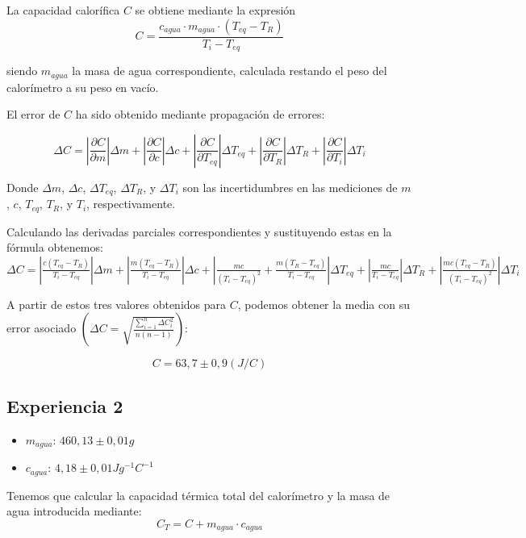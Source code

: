 \documentclass[a4paper,12pt,spanish]{article}
\begin{document}
	La capacidad calorífica $C$ se obtiene mediante la expresión
	\[ C= \frac{c_{agua}\cdot m_{agua}\cdot(T_{eq}-T_R)}{T_i-T_{eq}}
	\]
	
	siendo $m_{agua}$ la masa de agua correspondiente, calculada restando el peso del calorímetro a su peso en vacío.
	
	El error de $C$ ha sido obtenido mediante propagación de errores:
	
	\[\Delta C = \left|\frac{\partial C}{\partial m}\right|\Delta m + \left|\frac{\partial C}{\partial c}\right|\Delta c + \left|\frac{\partial C}{\partial T_{eq}}\right|\Delta T_{eq} + \left|\frac{\partial C}{\partial T_R}\right|\Delta T_R + \left|\frac{\partial C}{\partial T_i}\right|\Delta T_i\]
	
	Donde $\Delta m$, $\Delta c$, $\Delta T_{eq}$, $\Delta T_R$, y $\Delta T_i$ son las incertidumbres en las mediciones de $m$, $c$, $T_{eq}$, $T_R$, y $T_i$, respectivamente.
	
	Calculando las derivadas parciales correspondientes y sustituyendo estas en la fórmula obtenemos:\\
	
	$\Delta C = \left|\frac{c(T_{eq}-T_R)}{T_i-T_{eq}}\right|\Delta m + \left|\frac{m(T_{eq}-T_R)}{T_i-T_{eq}}\right|\Delta c + \left|\frac{mc}{(T_i-T_{eq})^2} + \frac{m(T_R-T_{eq})}{T_i-T_{eq}}\right|\Delta T_{eq} + \left|\frac{mc}{T_i-T_{eq}}\right|\Delta T_R + \left|\frac{mc(T_{eq}-T_R)}{(T_i-T_{eq})^2}\right|\Delta T_i$
	
	\vspace{12pt}
	\vspace{12pt}
	
	A partir de estos tres valores obtenidos para $C$, podemos obtener la media con su error asociado $\left(\Delta C = \sqrt{\frac{\sum_{i=1}^{n}\Delta C_i^2}{n(n-1)}}  \right)$:
	
	\[\boxed{C = 63,7 \pm 0,9  (\si{J/C}) }\]
	
	\subsection{Experiencia 2}
	
	\begin{itemize}
		\item $m_{agua}$: $460,13 \pm 0,01 \si{g}$
		\item $c_{agua}$: $4,18\pm 0,01 \si{Jg^{-1}C^{-1}}$
	\end{itemize}
	
	
	Tenemos que calcular la capacidad térmica total del calorímetro y la masa de agua introducida mediante:
	\[ C_T = C + m_{agua}\cdot c_{agua}
	\]
	
\end{document}
